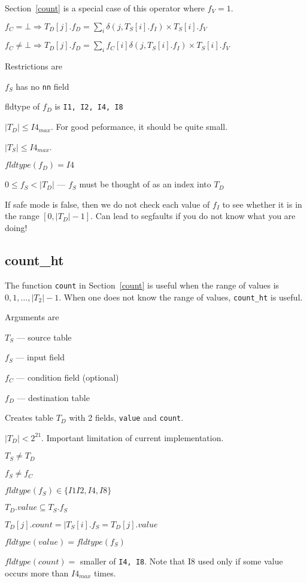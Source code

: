 Section~\ref{count} is a special case of this operator where \(f_V =
  1\).
\be
\item  \(f_C = \bot \Rightarrow 
T_D[j].f_D = \sum_i \delta(j, T_S[i].f_I) \times T_S[i].f_V\)
\item  \(f_C \neq \bot \Rightarrow 
T_D[j].f_D = \sum_i f_C[i] \delta(j, T_S[i].f_I) \times T_S[i].f_V\)
\ee

Restrictions are 
\be
\item \(f_S\) has no {\tt nn} field 
\item fldtype of \(f_D\) is {\tt I1, I2, I4, I8}
\item \(|T_D| \leq I4_{max}\). For good peformance, it should be quite small.
\item \(|T_S| \leq I4_{max}\). 
\item \(fldtype(f_D) = I4\)
\item \(0 \leq f_S < |T_D| \) --- \(f_S\) must be thought of as an
index into \(T_D\)
\item If safe mode is false, then we do not check each value of \(f_I\)
  to see whether it is in the range \([0, |T_D|-1]\). Can lead to
  segfaults if you do not know what you are doing!
\ee


\subsection{count\_ht}
\label{count_ht}

The function {\tt count} in Section~\ref{count} is useful when 
the range of values is \(0, 1, \ldots, |T_2|-1\). When one
does not know the range of values, \verb+count_ht+ is useful.

Arguments are 
\be
\item \(T_S\) --- source table
\item \(f_S\) --- input field 
\item \(f_C\) --- condition field  (optional)
\item \(f_D\) --- destination table
\ee

Creates table \(T_D\) with 2 fields, {\tt value} and {\tt count}.

\be
\item \(|T_D| < 2^{21}\). Important limitation of current implementation.
\item \(T_S \neq T_D\)
\item \(f_S \neq f_C\)
\item \(fldtype(f_S) \in \{I1 I2, I4, I8\}\)
\item \(T_D.value \subseteq T_S.f_S\)
\item \(T_D[j].count = |T_S[i].f_S = T_D[j].value\)
\item \(fldtype(value) = fldtype(f_S)\)
\item \(fldtype(count) = \) smaller of {\tt I4, I8}. Note that I8 used
only if some value occurs more than \(I4_{max}\) times.
\ee


